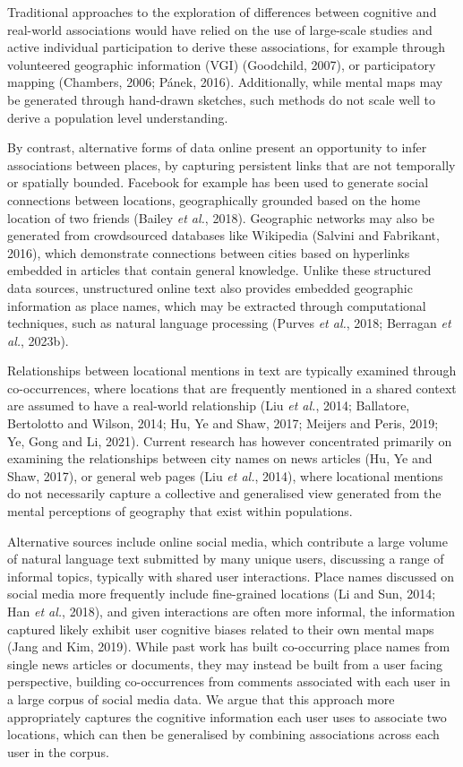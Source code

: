 \documentclass[
  letterpaper,
  11pt,
  english,
  onehalfspacing,
  headsepline]{MastersDoctoralThesis}
\begin{document}
Traditional approaches to the exploration of differences between
cognitive and real-world associations would have relied on the use of
large-scale studies and active individual participation to derive these
associations, for example through volunteered geographic information
(VGI) (Goodchild, 2007), or participatory mapping (Chambers, 2006;
Pánek, 2016). Additionally, while mental maps may be generated through
hand-drawn sketches, such methods do not scale well to derive a
population level understanding.

By contrast, alternative forms of data online present an opportunity to
infer associations between places, by capturing persistent links that
are not temporally or spatially bounded. Facebook for example has been
used to generate social connections between locations, geographically
grounded based on the home location of two friends (Bailey \emph{et
al.}, 2018). Geographic networks may also be generated from crowdsourced
databases like Wikipedia (Salvini and Fabrikant, 2016), which
demonstrate connections between cities based on hyperlinks embedded in
articles that contain general knowledge. Unlike these structured data
sources, unstructured online text also provides embedded geographic
information as place names, which may be extracted through computational
techniques, such as natural language processing (Purves \emph{et al.},
2018; Berragan \emph{et al.}, 2023b).

Relationships between locational mentions in text are typically examined
through co-occurrences, where locations that are frequently mentioned in
a shared context are assumed to have a real-world relationship (Liu
\emph{et al.}, 2014; Ballatore, Bertolotto and Wilson, 2014; Hu, Ye and
Shaw, 2017; Meijers and Peris, 2019; Ye, Gong and Li, 2021). Current
research has however concentrated primarily on examining the
relationships between city names on news articles (Hu, Ye and Shaw,
2017), or general web pages (Liu \emph{et al.}, 2014), where locational
mentions do not necessarily capture a collective and generalised view
generated from the mental perceptions of geography that exist within
populations.

Alternative sources include online social media, which contribute a
large volume of natural language text submitted by many unique users,
discussing a range of informal topics, typically with shared user
interactions. Place names discussed on social media more frequently
include fine-grained locations (Li and Sun, 2014; Han \emph{et al.},
2018), and given interactions are often more informal, the information
captured likely exhibit user cognitive biases related to their own
mental maps (Jang and Kim, 2019). While past work has built co-occurring
place names from single news articles or documents, they may instead be
built from a user facing perspective, building co-occurrences from
comments associated with each user in a large corpus of social media
data. We argue that this approach more appropriately captures the
cognitive information each user uses to associate two locations, which
can then be generalised by combining associations across each user in
the corpus.
\end{document}
